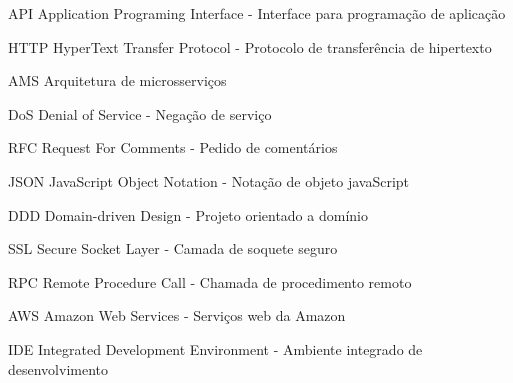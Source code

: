 
\begin{siglas}
	\item[API]{Application Programing Interface - Interface para programação de aplicação}
	\item[HTTP]{HyperText Transfer Protocol - Protocolo de transferência de hipertexto}
	\item[AMS]{Arquitetura de microsserviços}
	\item[DoS]{Denial of Service - Negação de serviço}
	\item[RFC]{Request For Comments - Pedido de comentários}
	\item[JSON]{JavaScript Object Notation - Notação de objeto javaScript}
	\item[DDD]{Domain-driven Design - Projeto orientado a domínio}
	\item[SSL]{Secure Socket Layer - Camada de soquete seguro}
	\item[RPC]{Remote Procedure Call - Chamada de procedimento remoto} 
	\item[AWS]{Amazon Web Services - Serviços web da Amazon} 
	\item[IDE]{Integrated Development Environment - Ambiente integrado de desenvolvimento} 
\end{siglas}